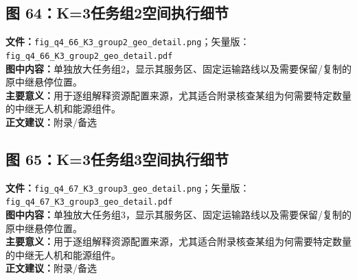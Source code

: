 \subsection*{图 64：K=3任务组2空间执行细节}
\textbf{文件：}\texttt{fig\_q4\_66\_K3\_group2\_geo\_detail.png}；矢量版：\texttt{fig\_q4\_66\_K3\_group2\_geo\_detail.pdf}\\
\textbf{图中内容：}单独放大任务组2，显示其服务区、固定运输路线以及需要保留/复制的原中继悬停位置。\\
\textbf{主要意义：}用于逐组解释资源配置来源，尤其适合附录核查某组为何需要特定数量的中继无人机和能源组件。\\
\textbf{正文建议：}附录/备选

\subsection*{图 65：K=3任务组3空间执行细节}
\textbf{文件：}\texttt{fig\_q4\_67\_K3\_group3\_geo\_detail.png}；矢量版：\texttt{fig\_q4\_67\_K3\_group3\_geo\_detail.pdf}\\
\textbf{图中内容：}单独放大任务组3，显示其服务区、固定运输路线以及需要保留/复制的原中继悬停位置。\\
\textbf{主要意义：}用于逐组解释资源配置来源，尤其适合附录核查某组为何需要特定数量的中继无人机和能源组件。\\
\textbf{正文建议：}附录/备选
